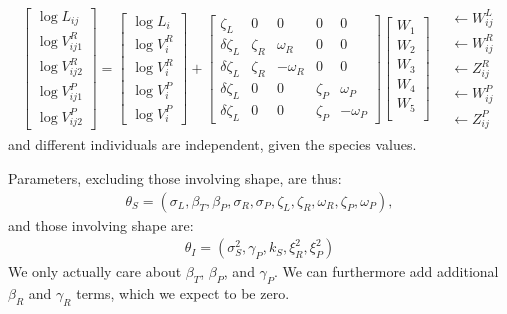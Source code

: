 \documentclass{article}
\begin{document}
\begin{align}
\begin{bmatrix}
    \log L_{ij} \\
    \log V_{ij1}^R \\ \log V_{ij2}^R  \\
    \log V_{ij1}^P \\ \log V_{ij2}^P  
\end{bmatrix}
=
\begin{bmatrix}
    \log L_{i} \\
    \log V_{i}^R \\ \log V_{i}^R  \\
    \log V_{i}^P \\ \log V_{i}^P  
\end{bmatrix}
+
\begin{bmatrix}
    \zeta_L  &   0 & 0  & 0  & 0 \\
    \delta \zeta_L  &  \zeta_R  &  \omega_R  & 0 & 0 \\ 
    \delta \zeta_L  & \zeta_R   & - \omega_R & 0 & 0\\ 
    \delta \zeta_L  & 0 & 0 &  \zeta_P  & \omega_P  \\ 
    \delta \zeta_L  & 0 & 0 &  \zeta_P  & - \omega_P
\end{bmatrix}
\begin{bmatrix}
W_1 \\W_2 \\W_3 \\W_4 \\ W_5  \\ 
\end{bmatrix}
\quad \begin{matrix}
    \leftarrow W^L_{ij}  \\
    \leftarrow W^R_{ij}  \\
    \leftarrow Z^R_{ij}  \\
    \leftarrow W^P_{ij} \\ 
    \leftarrow Z^P_{ij} 
\end{matrix}
\end{align}
and different individuals are independent, given the species values.

Parameters, excluding those involving shape, are thus:
\begin{align}
    \theta_S = (
    \sigma_L,
    \beta_T,
    \beta_P,
    \sigma_R,
    \sigma_P,
    \zeta_L,
    \zeta_R,
    \omega_R,
    \zeta_P,
    \omega_P
    ) ,
\end{align}
and those involving shape are:
\begin{align}
    \theta_I = (
    \sigma^2_S,
    \gamma_P,
    k_S,
    \xi^2_R,
    \xi^2_P
    )
\end{align}
We only actually care about $\beta_T$, $\beta_P$, and $\gamma_P$.
We can furthermore add additional $\beta_R$ and $\gamma_R$ terms, which we expect to be zero.
\end{document}
